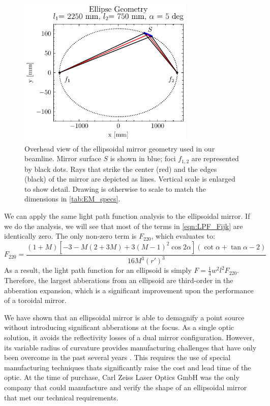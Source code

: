 \begin{figure}
	\centering
	\includegraphics[width=0.75\textwidth]{figures/chap2/EM_2D.pdf}
	\caption{Overhead view of the ellipsoidal mirror geometry used in our beamline. Mirror surface $S$ is shown in blue; foci $f_{1,2}$ are represented by black dots. Rays that strike the center (red) and the edges (black) of the mirror are depicted as lines. Vertical scale is enlarged to show detail. Drawing is otherwise to scale to match the dimensions in \cref{tab:EM_specs}.}
	\label{fig:EM_2D}
\end{figure}

We can apply the same light path function analysis to the ellipsoidal mirror. If we do the analysis, we will see that most of the terms in \cref{eqn:LPF_Fijk} are identically zero. The only non-zero term is $F_{220}$, which evaluates to:
\begin{equation}
F_{220} = \frac{(1+M) \left[-3-M(2+3M)+3(M-1)^2 \cos 2 \alpha \right] (\cot \alpha + \tan \alpha -2)}{16 M^3 (r')^3}
\end{equation}
As a result, the light path function for an ellipsoid is simply $F = \frac{1}{4} w^2 l^2 F_{220}$. Therefore, the largest abberations from an ellipsoid are third-order in the abberation expansion, which is a significant improvement upon the performance of a toroidal mirror.

We have shown that an ellipsoidal mirror is able to demagnify a point source without introducing significant abberations at the focus. As a single optic solution, it avoids the reflectivity losses of a dual mirror configuration. However, its variable radius of curvature provides manufacturing challenges that have only been overcome in the past several years \cite{motoyamaErrorAnalysisEllipsoidal2014}. This requires the use of special manufacturing techniques thats significantly raise the cost and lead time of the optic. At the time of purchase, Carl Zeiss Laser Optics GmbH was the only company that could manufacture and verify the shape of an ellipsoidal mirror that met our technical requirements.

